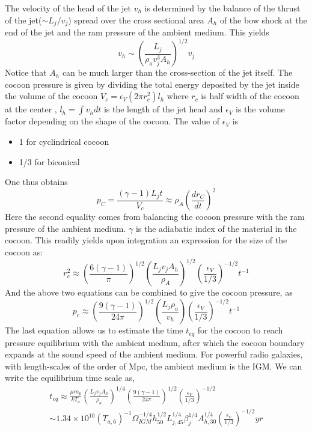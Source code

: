 \documentclass[11pt]{report}
\newcommand{\de}[2]{\frac{d{#1}}{d{#2}}}
\newcommand{\cc}[1]{\left({#1}\right)}
\begin{document}
The velocity of the head of the jet $v_h$ is determined by the balance of the thrust of the jet($\sim L_j/v_j$) spread over the cross sectional area $A_h$ of the bow shock at the end of the jet and the ram pressure of the ambient medium. This yields
\begin{equation}
v_h \sim \cc{\frac{L_j}{\rho_a v^3_j A_h}}^{1/2}v_j
\end{equation}
Notice that $A_h$ can be much larger than the cross-section of the jet itself. The cocoon pressure is given by dividing the total energy deposited by the jet inside the volume of the cocoon $V_c= \epsilon_V (2\pi r^2_c)l_h$ where $r_c$ is half width of the cocoon at the center , $l_h=\int v_h dt$ is the length of the jet head and $\epsilon_V$ is the volume factor depending on the shape of the cocoon. The value of $\epsilon_V$ is
\begin{itemize}
\item 1 for cyclindrical cocoon
\item 1/3 for biconical
\end{itemize} 
One thus obtains 
\begin{equation}
p_C=\frac{(\gamma-1)L_jt}{V_c}\approx \rho_A\cc{\de{r_C}{t}}^2
\end{equation}
Here the second equality comes from balancing the cocoon pressure with the ram pressure of the ambient medium. $\gamma$ is the adiabatic index of the material in the cocoon. This readily yields upon integration an expression for the size of the cocoon as:
\begin{equation}
r_c^2 \approx \cc{\frac{6 (\gamma -1)}{\pi}}^{1/2} \cc{\frac{L_jv_jA_h}{\rho_A}}^{1/2}\cc{\frac{\epsilon_V}{1/3}}^{-1/2}t^{-1}
\end{equation}
And the above two equations can be combined to give the cocoon pressure, as
\begin{equation}
p_c\approx \cc{\frac{9(\gamma-1)}{24\pi}}^{1/2}\cc{\frac{L_j \rho_a}{v_h}}\cc{\frac{\epsilon_V}{1/3}}^{-1/2}t^{-1}
\end{equation}
The last equation  allows us to estimate the time $t_{eq}$ for the cocoon to reach pressure equilibrium with the ambient medium, after which the cocoon boundary expands at the sound speed of the ambient medium. For powerful radio galaxies, with length-scales of the order of Mpc, the ambient medium is the IGM. We can write the equilibrium time
scale as,
\begin{eqnarray}
t_{eq}\approx\frac{\mu m_p}{kT_a}\cc{\frac{L_jv_jA_h}{\rho_a}}^{1/4}\cc{\frac{9(\gamma-1)}{24 \pi}}^{1/2}\cc{\frac{\epsilon_V}{1/3}}^{-1/2}\\
\sim 1.34 \times 10^{10}(T_{a,6})^{-1}\Omega^{-1/4}_{IGM}h^{1/2}_{50}L^{1/4}_{j,45}\beta^{1/4}_j A^{1/4}_{h,30}\cc{\frac{\epsilon_V}{1/3}}^{-1/2}yr
\end{eqnarray}
\end{document}
